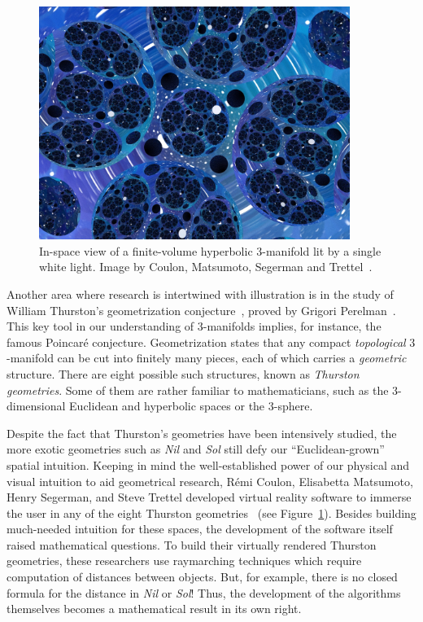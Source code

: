 \documentclass{notices}
\begin{document}
\begin{figure}[ht]
    \centering
    \includegraphics[width=0.9\textwidth]{images/hypLowResPostProd.jpeg}
    \caption{In-space view of a finite-volume hyperbolic $3$-manifold lit by a single white light.
    Image by Coulon, Matsumoto, Segerman and Trettel~\cite{Coulon:2020ac}.}
    \label{fig:hyp}
\end{figure}

Another area where research is intertwined with illustration is in the study of William Thurston's geometrization conjecture~\cite{geoConjecture}, proved by Grigori Perelman~\cites{perelman1,perelman2,perelman3}.
This key tool in our understanding of $3$-manifolds implies, for instance, the famous Poincaré conjecture. 
Geometrization states that any compact \emph{topological} $3$-manifold can be cut into finitely many pieces, each of which carries a \emph{geometric} structure. 
There are eight possible such structures, known as \emph{Thurston geometries}.
Some of them are rather familiar to mathematicians, such as the 3-dimensional Euclidean and hyperbolic spaces or the $3$-sphere.

Despite the fact that Thurston's geometries have been intensively studied, the more exotic geometries such as \emph{Nil} and \emph{Sol} still defy our ``Euclidean-grown'' spatial intuition.  Keeping in mind the well-established power of our physical and visual intuition to aid geometrical research, R{\'e}mi Coulon, Elisabetta Matsumoto, Henry Segerman, and Steve Trettel developed virtual reality software to immerse the user in any of the eight Thurston geometries~\cite{Coulon:2020ac} (see Figure~\ref{fig:hyp}).  
Besides building much-needed intuition for these spaces, the development of the software itself raised mathematical questions.  %
To build their virtually rendered Thurston geometries, these researchers use raymarching techniques which require computation of distances between objects.  But, for example, there is no closed formula for the distance in \emph{Nil} or \emph{Sol}!  Thus, the development of the algorithms themselves becomes a mathematical result in its own right.
\end{document}
